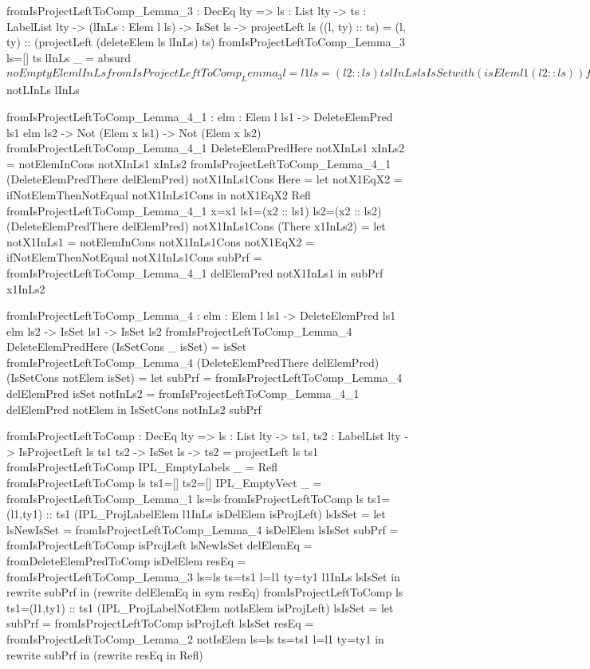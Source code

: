 \begin{code}
fromIsProjectLeftToComp_Lemma_3 : DecEq lty => {ls : List lty} -> 
  {ts : LabelList lty} -> (lInLs : Elem l ls) -> IsSet ls ->
  projectLeft ls ((l, ty) :: ts) = 
    (l, ty) :: (projectLeft (deleteElem ls lInLs) ts)
fromIsProjectLeftToComp_Lemma_3 {ls=[]} {ts} lInLs _ = 
  absurd $ noEmptyElem lInLs
fromIsProjectLeftToComp_Lemma_3 {l=l1} {ls=(l2 :: ls)} {ts} 
  lInLs lsIsSet with (isElem l1 (l2::ls))
  fromIsProjectLeftToComp_Lemma_3 {l=l1} {ls=(l2 :: ls)} {ts} 
    lInLs lsIsSet | Yes lInLsAux =
    let delElemEq = 
          fromIsProjectLeftToComp_Lemma_3_1 {ls=(l2 :: ls)} 
            {elm1=lInLs} {elm2=lInLsAux} lsIsSet
    in rewrite delElemEq in Refl
  fromIsProjectLeftToComp_Lemma_3 {l=l1} {ls=(l2 :: ls)} {ts} 
    lInLs lsIsSet | No notLInLs = absurd $ notLInLs lInLs

fromIsProjectLeftToComp_Lemma_4_1 : {elm : Elem l ls1} -> 
  DeleteElemPred ls1 elm ls2 -> Not (Elem x ls1) -> 
  Not (Elem x ls2)
fromIsProjectLeftToComp_Lemma_4_1 DeleteElemPredHere notXInLs1 
  xInLs2 = notElemInCons notXInLs1 xInLs2
fromIsProjectLeftToComp_Lemma_4_1 (DeleteElemPredThere delElemPred) 
  notX1InLs1Cons Here = 
  let notX1EqX2 = ifNotElemThenNotEqual notX1InLs1Cons
  in notX1EqX2 Refl
fromIsProjectLeftToComp_Lemma_4_1 {x=x1} {ls1=(x2 :: ls1)} 
  {ls2=(x2 :: ls2)} (DeleteElemPredThere delElemPred) 
  notX1InLs1Cons (There x1InLs2) =
  let notX1InLs1 = notElemInCons notX1InLs1Cons
      notX1EqX2 = ifNotElemThenNotEqual notX1InLs1Cons
      subPrf = 
        fromIsProjectLeftToComp_Lemma_4_1 delElemPred notX1InLs1
  in subPrf x1InLs2

fromIsProjectLeftToComp_Lemma_4 : {elm : Elem l ls1} -> 
  DeleteElemPred ls1 elm ls2 -> IsSet ls1 -> IsSet ls2
fromIsProjectLeftToComp_Lemma_4 DeleteElemPredHere 
  (IsSetCons _ isSet) = isSet
fromIsProjectLeftToComp_Lemma_4 (DeleteElemPredThere delElemPred) 
  (IsSetCons notElem isSet) = 
  let subPrf = fromIsProjectLeftToComp_Lemma_4 delElemPred isSet
      notInLs2 = 
        fromIsProjectLeftToComp_Lemma_4_1 delElemPred notElem
  in IsSetCons notInLs2 subPrf

fromIsProjectLeftToComp : DecEq lty => {ls : List lty} -> 
  {ts1, ts2 : LabelList lty} -> IsProjectLeft ls ts1 ts2 -> 
  IsSet ls -> ts2 = projectLeft ls ts1
fromIsProjectLeftToComp IPL_EmptyLabels _ = Refl
fromIsProjectLeftToComp {ls} {ts1=[]} {ts2=[]} IPL_EmptyVect _ = 
  fromIsProjectLeftToComp_Lemma_1 {ls=ls}
fromIsProjectLeftToComp {ls} {ts1=(l1,ty1) :: ts1} 
  (IPL_ProjLabelElem l1InLs isDelElem isProjLeft) lsIsSet =
  let lsNewIsSet = fromIsProjectLeftToComp_Lemma_4 isDelElem lsIsSet
      subPrf = fromIsProjectLeftToComp isProjLeft lsNewIsSet
      delElemEq = fromDeleteElemPredToComp isDelElem
      resEq = 
        fromIsProjectLeftToComp_Lemma_3 {ls=ls} {ts=ts1} {l=l1} 
          {ty=ty1} l1InLs lsIsSet
  in rewrite subPrf in (rewrite delElemEq in sym resEq)
fromIsProjectLeftToComp {ls} {ts1=(l1,ty1) :: ts1} 
  (IPL_ProjLabelNotElem notIsElem isProjLeft) lsIsSet =
  let subPrf = fromIsProjectLeftToComp isProjLeft lsIsSet
      resEq = 
        fromIsProjectLeftToComp_Lemma_2 notIsElem {ls=ls} 
          {ts=ts1} {l=l1} {ty=ty1}
  in rewrite subPrf in (rewrite resEq in Refl)
  

\end{code}
